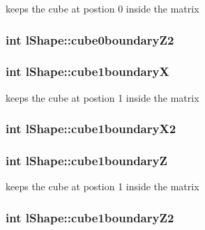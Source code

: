 keeps the cube at postion 0 inside the matrix \hypertarget{classl_shape_ab7b42fc5ba4716bca56f7a2c77ce11b8}{
\subsubsection[{cube0boundary\-Z2}]{\setlength{\rightskip}{0pt plus 5cm}int l\-Shape\-::cube0boundary\-Z2}}\label{classl_shape_ab7b42fc5ba4716bca56f7a2c77ce11b8}
\hypertarget{classl_shape_ad55fd69b555360ad332e15c30e4d496a}{
\subsubsection[{cube1boundary\-X}]{\setlength{\rightskip}{0pt plus 5cm}int l\-Shape\-::cube1boundary\-X}}\label{classl_shape_ad55fd69b555360ad332e15c30e4d496a}
keeps the cube at postion 1 inside the matrix \hypertarget{classl_shape_a89bc6ad05e9a45db52341c5ef745b020}{
\subsubsection[{cube1boundary\-X2}]{\setlength{\rightskip}{0pt plus 5cm}int l\-Shape\-::cube1boundary\-X2}}\label{classl_shape_a89bc6ad05e9a45db52341c5ef745b020}
\hypertarget{classl_shape_adc6f45919d650e2d0f487a186bfb95b3}{
\subsubsection[{cube1boundary\-Z}]{\setlength{\rightskip}{0pt plus 5cm}int l\-Shape\-::cube1boundary\-Z}}\label{classl_shape_adc6f45919d650e2d0f487a186bfb95b3}
keeps the cube at postion 1 inside the matrix \hypertarget{classl_shape_a79e7fe12075824f2f6aeab228bccb6ca}{
\subsubsection[{cube1boundary\-Z2}]{\setlength{\rightskip}{0pt plus 5cm}int l\-Shape\-::cube1boundary\-Z2}}\label{classl_shape_a79e7fe12075824f2f6aeab228bccb6ca}
